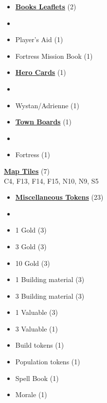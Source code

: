 
\begin{multicols*}{3}

\footnotesize

\begin{itemize}[leftmargin=0pt, label={}, noitemsep, noitemsep]
  \item \textbf{\small{\underline{Books Leaflets}}} (2)
  \item
  \item Player's Aid (1)
  \item Fortress Mission Book (1)
\end{itemize}

\begin{itemize}[leftmargin=0pt, label={}, noitemsep, noitemsep]
  \item \textbf{\small{\underline{Hero Cards}}} (1)
  \item
  \item Wystan/Adrienne (1)
\end{itemize}

\begin{itemize}[leftmargin=0pt, label={}, noitemsep, noitemsep]
  \item \textbf{\small{\underline{Town Boards}}} (1)
  \item
  \item Fortress (1)
\end{itemize}

\textbf{\small{\underline{Map Tiles}}} (7)\\

C4, F13, F14, F15, N10, N9, S5

\begin{itemize}[leftmargin=0pt, label={}, noitemsep, noitemsep]
  \item \textbf{\small{\underline{Miscellaneous Tokens}}} (23)
  \item
  \item 1 Gold (3)
  \item 3 Gold (3)
  \item 10 Gold (3)
  \item 1 Building material (3)
  \item 3 Building material (3)
  \item 1 Valuable (3)
  \item 3 Valuable (1)
  \item Build tokens (1)
  \item Population tokens (1)
  \item Spell Book (1)
  \item Morale (1)
\end{itemize}


\end{multicols*}
